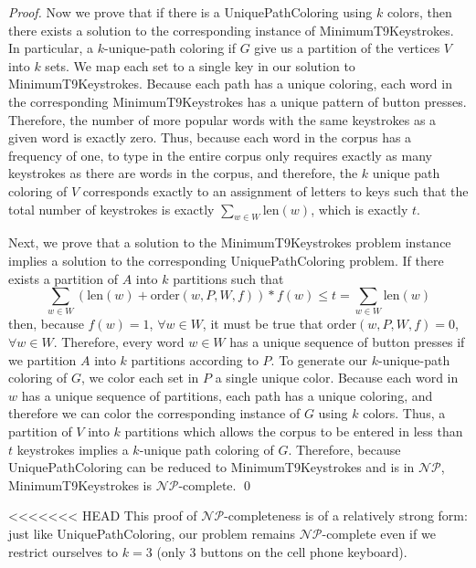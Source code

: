\documentclass[runningheads]{llncs}
\newcommand{\NP}{\ensuremath{\mathcal{NP}}}
\begin{document}
\begin{prob}[{\sc
MinimumKeystrokes}]
\begin{proof}
Now we prove that if there is a {\sc UniquePathColoring} using $k$ colors, then
there exists a solution to the corresponding instance of {\sc
MinimumT9Keystrokes}.  In particular, a $k$-unique-path coloring if $G$ give us
a partition of the vertices $V$ into $k$ sets.  We map each set to a single key
in our solution to {\sc MinimumT9Keystrokes}.  Because each path has a unique
coloring, each word in the corresponding {\sc MinimumT9Keystrokes} has a unique
pattern of button presses.  Therefore, the number of more popular words with
the same keystrokes as a given word is exactly zero.  Thus, because each word
in the corpus has a frequency of one, to type in the entire corpus only
requires exactly as many keystrokes as there are words in the corpus, and
therefore, the $k$ unique path coloring of $V$ corresponds exactly to an
assignment of letters to keys such that the total number of keystrokes is
exactly $\sum_{w\in W} \mathrm{len}(w)$, which is exactly $t$.

Next, we prove that a solution to the {\sc MinimumT9Keystrokes} problem
instance implies a solution to the corresponding {\sc UniquePathColoring}
problem.  If there exists a partition of $A$ into $k$ partitions such that
$$\sum_{w\in W} (\mathrm{len}(w)+\mathrm{order}(w,P,W,f))*f(w) \le t =
\sum_{w\in W} \mathrm{len}(w)$$ then, because $f(w) = 1$, $ \forall w \in W$,
it must be true that $\mathrm{order}(w,P,W,f) = 0$,  $\forall w \in W$.
Therefore, every word $w \in W$ has a unique sequence of button presses if we
partition $A$ into $k$ partitions according to $P$.  To generate our
$k$-unique-path coloring of $G$, we color each set in $P$ a single unique
color.  Because each word in $w$ has a unique sequence of partitions, each path
has a unique coloring, and therefore we can color the corresponding instance of
$G$ using $k$ colors.  Thus, a partition of $V$ into $k$ partitions which allows the corpus to be entered in less than $t$ keystrokes implies a $k$-unique path coloring of $G$.  Therefore, because {\sc UniquePathColoring} can be reduced to {\sc MinimumT9Keystrokes} and is in \NP, {\sc MinimumT9Keystrokes} is \NP-complete.
\qed
\end{proof}

<<<<<<< HEAD
This proof of \NP-completeness is of a relatively strong form: just like {\sc UniquePathColoring}, our problem remains \NP-complete even if we restrict ourselves to $k=3$ (only 3 buttons on the cell phone keyboard).


\end{prob}
\end{document}
